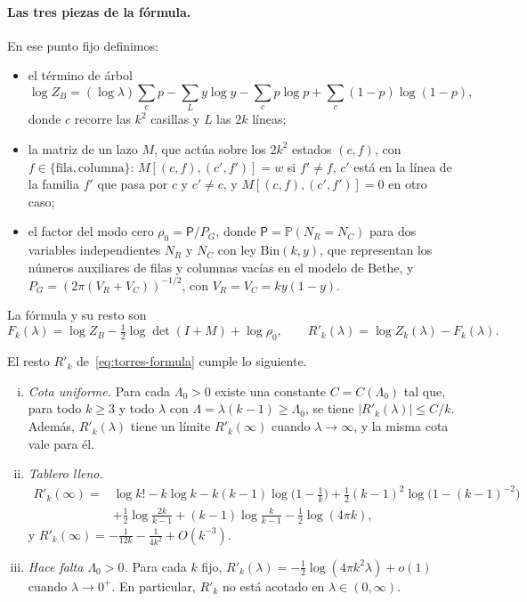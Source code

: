 \paragraph{Las tres piezas de la fórmula.}
En ese punto fijo definimos:
\begin{itemize}
\item el término de árbol
 \[
  \log Z_B=(\log\lambda)\sum_cp-\sum_Ly\log y-\sum_cp\log p+\sum_c(1-p)\log(1-p),
 \]
 donde $c$ recorre las $k^2$ casillas y $L$ las $2k$ líneas;
\item la matriz de un lazo $M$, que actúa sobre los $2k^2$ estados $(c,f)$, con
 $f\in\{\text{fila},\text{columna}\}$: $M[(c,f),(c',f')]=w$ si $f'\ne f$, $c'$ está en la línea de la
 familia $f'$ que pasa por $c$ y $c'\ne c$, y $M[(c,f),(c',f')]=0$ en otro caso;
\item el factor del modo cero $\rho_0=\mathsf P/P_G$, donde $\mathsf P=\mathbb P(N_R=N_C)$ para dos
variables
 independientes $N_R$ y $N_C$ con ley $\mathrm{Bin}(k,y)$, que representan los números auxiliares de filas y
 columnas vacías en el modelo de Bethe, y $P_G=(2\pi(V_R+V_C))^{-1/2}$, con $V_R=V_C=ky(1-y)$.
\end{itemize}
La fórmula y su resto son
\begin{equation}\label{eq:torres-formula}
 F_k(\lambda)=\log Z_B-\tfrac12\log\det(I+M)+\log\rho_0,\qquad R'_k(\lambda)=\log Z_k(\lambda)-F_k(\lambda).
\end{equation}

\begin{teorema}\label{thm:torres}
El resto $R'_k$ de~\eqref{eq:torres-formula} cumple lo siguiente.
\begin{enumerate}[(i)]
\item \emph{Cota uniforme.} Para cada $\Lambda_0>0$ existe una constante $C=C(\Lambda_0)$ tal que, para
 todo $k\ge3$ y todo $\lambda$ con $\Lambda=\lambda(k-1)\ge\Lambda_0$, se tiene $|R'_k(\lambda)|\le C/k$.
 Además, $R'_k(\lambda)$ tiene un límite $R'_k(\infty)$ cuando $\lambda\to\infty$, y la misma cota vale
 para él.
\item \emph{Tablero lleno.}
 \[
 \begin{aligned}
  R'_k(\infty)={}&\log k!-k\log k-k(k-1)\log\bigl(1-\tfrac1k\bigr)
  +\tfrac12(k-1)^2\log\bigl(1-(k-1)^{-2}\bigr)\\
  &+\tfrac12\log\frac{2k}{k-1}+(k-1)\log\frac k{k-1}-\tfrac12\log(4\pi k),
 \end{aligned}
 \]
 y $R'_k(\infty)=-\frac1{12k}-\frac1{4k^2}+O(k^{-3})$.
\item \emph{Hace falta $\Lambda_0>0$.} Para cada $k$ fijo,
$R'_k(\lambda)=-\frac12\log(4\pi k^2\lambda)+o(1)$
 cuando $\lambda\to0^+$. En particular, $R'_k$ no está acotado en $\lambda\in(0,\infty)$.
\end{enumerate}
\end{teorema}

